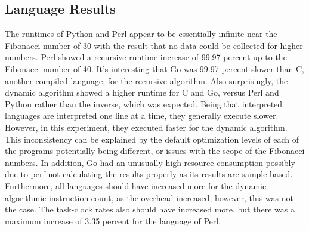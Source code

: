 \documentclass{sig-alternate}
\begin{document}
\subsection{Language Results}
The runtimes of Python and Perl appear to be essentially infinite near the Fibonacci number of 30 with the result that no data could be collected for higher numbers. Perl showed a recursive runtime increase of 99.97 percent up to the Fibonacci number of 40. It’s interesting that Go was 99.97 percent slower than C, another compiled language, for the recursive algorithm. Also surprisingly, the dynamic algorithm showed a higher runtime for C and Go, versus Perl and Python rather than the inverse, which was expected. Being that interpreted languages are interpreted one line at a time, they generally execute slower. However, in this experiment, they executed faster for the dynamic algorithm. This inconsistency can be explained by the default optimization levels of each of the programs potentially being different, or issues with the scope of the Fibonacci numbers. In addition, Go had an unusually high resource consumption possibly due to perf not calculating the results properly as its results are sample based. Furthermore, all languages should have increased more for the dynamic algorithmic instruction count, as the overhead increased; however, this was not the case. The task-clock rates also should have increased more, but there was a maximum increase of 3.35 percent for the language of Perl.
\end{document}
